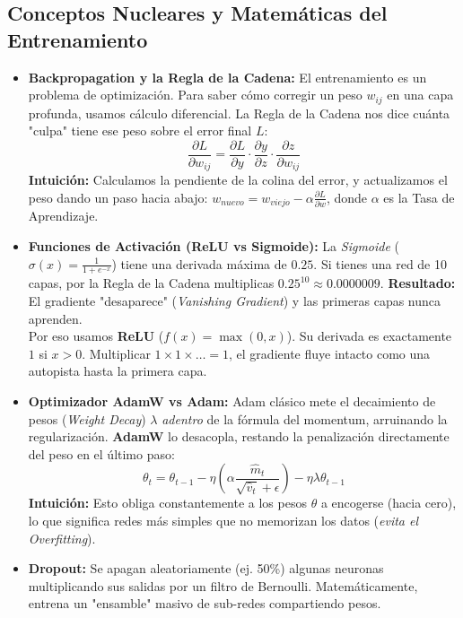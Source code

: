 \documentclass[11pt,a4paper]{article}
\begin{document}
\subsection{Conceptos Nucleares y Matem\'aticas del Entrenamiento}
\begin{itemize}
    \item \textbf{Backpropagation y la Regla de la Cadena:} El entrenamiento es un problema de optimizaci\'on. Para saber c\'omo corregir un peso $w_{ij}$ en una capa profunda, usamos c\'alculo diferencial. La Regla de la Cadena nos dice cu\'anta "culpa" tiene ese peso sobre el error final $L$:
    \begin{equation}
    \frac{\partial L}{\partial w_{ij}} = \frac{\partial L}{\partial y} \cdot \frac{\partial y}{\partial z} \cdot \frac{\partial z}{\partial w_{ij}}
    \end{equation}
    \textbf{Intuici\'on:} Calculamos la pendiente de la colina del error, y actualizamos el peso dando un paso hacia abajo: $w_{nuevo} = w_{viejo} - \alpha \frac{\partial L}{\partial w}$, donde $\alpha$ es la Tasa de Aprendizaje.
    
    \item \textbf{Funciones de Activaci\'on (ReLU vs Sigmoide):} La \emph{Sigmoide} ($\sigma(x) = \frac{1}{1 + e^{-x}}$) tiene una derivada m\'axima de $0.25$. Si tienes una red de 10 capas, por la Regla de la Cadena multiplicas $0.25^{10} \approx 0.0000009$. \textbf{Resultado:} El gradiente "desaparece" (\emph{Vanishing Gradient}) y las primeras capas nunca aprenden. \\
    Por eso usamos \textbf{ReLU} ($f(x) = \max(0, x)$). Su derivada es exactamente $1$ si $x > 0$. Multiplicar $1 \times 1 \times \dots = 1$, el gradiente fluye intacto como una autopista hasta la primera capa.

    \item \textbf{Optimizador AdamW vs Adam:} Adam cl\'asico mete el decaimiento de pesos (\emph{Weight Decay}) $\lambda$ \emph{adentro} de la f\'ormula del momentum, arruinando la regularizaci\'on. \textbf{AdamW} lo desacopla, restando la penalizaci\'on directamente del peso en el \'ultimo paso:
    \begin{equation}
    \theta_t = \theta_{t-1} - \eta \left( \alpha \frac{\hat{m}_t}{\sqrt{\hat{v}_t} + \epsilon} \right) - \eta \lambda \theta_{t-1}
    \end{equation}
    \textbf{Intuici\'on:} Esto obliga constantemente a los pesos $\theta$ a encogerse (hacia cero), lo que significa redes m\'as simples que no memorizan los datos (\emph{evita el Overfitting}).

    \item \textbf{Dropout:} Se apagan aleatoriamente (ej. 50\%) algunas neuronas multiplicando sus salidas por un filtro de Bernoulli. Matem\'aticamente, entrena un "ensamble" masivo de sub-redes compartiendo pesos.
\end{itemize}
\end{document}
